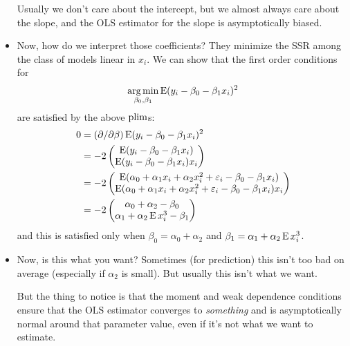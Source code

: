 \begin{itemize}[leftmargin=0pt]
  Usually we don't care about the intercept, but we almost always care
  about the slope, and the OLS estimator for the slope is
  asymptotically biased.

\item Now, how do we interpret those coefficients?  They minimize the
  SSR among the class of models linear in $x_i$.  We can show that the
  first order conditions for
  \begin{equation*}
    \operatorname*{arg\,min}_{\beta_0, \beta_1} \operatorname{E} (y_i - \beta_0 - \beta_1 x_i)^2 
  \end{equation*}
  are satisfied by the above $\operatorname*{plim}$s:
  \begin{align*}
    0
    &= (\partial /\partial \beta) \operatorname{E} (y_i - \beta_0 - \beta_1 x_i)^2 \\
    &= - 2
    \begin{pmatrix}
      \operatorname{E} (y_i - \beta_0 - \beta_1 x_i) \\
      \operatorname{E} (y_i - \beta_0 - \beta_1 x_i) x_i
    \end{pmatrix} \\
    &= - 2
    \begin{pmatrix}
      \operatorname{E} (\alpha_0 + \alpha_1 x_i + \alpha_2 x_i^2 + \varepsilon_i - \beta_0 - \beta_1 x_i) \\
      \operatorname{E} (\alpha_0 + \alpha_1 x_i + \alpha_2 x_i^2 + \varepsilon_i - \beta_0 - \beta_1 x_i) x_i
    \end{pmatrix} \\
    &= - 2
    \begin{pmatrix}
      \alpha_0 + \alpha_2 - \beta_0 \\
      \alpha_1 + \alpha_2 \operatorname{E} x_i^3 - \beta_1
    \end{pmatrix}
  \end{align*}
  and this is satisfied only when $\beta_0 = \alpha_0 + \alpha_2$ and
  $\beta_1 = \alpha_1 + \alpha_2 \operatorname{E} x_i^3$.

\item Now, is this what you want?  Sometimes (for prediction) this
  isn't too bad on average (especially if $\alpha_2$ is small).  But
  usually this isn't what we want.

  But the thing to notice is that the moment and weak dependence
  conditions ensure that the OLS estimator converges to
  \emph{something} and is asymptotically normal around that parameter
  value, even if it's not what we want to estimate.


\end{itemize}
